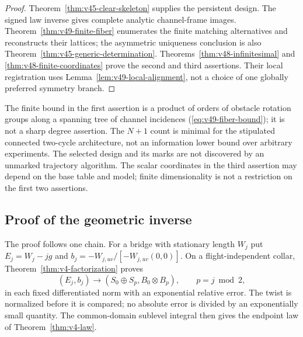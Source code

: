 \begin{proof}
Theorem~\ref{thm:v45-clear-skeleton} supplies the persistent design.
The signed law inverse gives complete analytic channel-frame images.
Theorem~\ref{thm:v49-finite-fiber} enumerates the finite matching
alternatives and reconstructs their lattices; the asymmetric uniqueness
conclusion is also Theorem~\ref{thm:v45-generic-determination}.
Theorems~\ref{thm:v48-infinitesimal} and
\ref{thm:v48-finite-coordinates} prove the second and third assertions.
Their local registration uses Lemma~\ref{lem:v49-local-alignment}, not
a choice of one globally preferred symmetry branch.
\end{proof}

The finite bound in the first assertion is a product of orders of
obstacle rotation groups along a spanning tree of channel incidences
(\eqref{eq:v49-fiber-bound}); it is not a sharp degree assertion.
The $N+1$ count is minimal for the stipulated connected two-cycle
architecture, not an information lower bound over arbitrary experiments.
The selected design and its marks are not discovered by an unmarked
trajectory algorithm.  The scalar coordinates in the third assertion
may depend on the base table and model; finite dimensionality is not a
restriction on the first two assertions.



\subsection{Proof of the geometric inverse}

The proof follows one chain.  For a bridge with stationary length
$W_j$ put $E_j=W_j-jg$ and
$b_j=-W_{j,uv}/[-W_{j,uv}(0,0)]$.  On a flight-independent collar,
Theorem~\ref{thm:v4-factorization} proves
\[
 (E_j,b_j)\longrightarrow(S_0\oplus S_p,B_0\otimes B_p),
                  \qquad p=j\bmod2,
\]
in each fixed differentiated norm with an exponential relative error.
The twist is normalized before it is compared; no absolute error is
divided by an exponentially small quantity.  The common-domain sublevel
integral then gives the endpoint law of
Theorem~\ref{thm:v4-law}.

